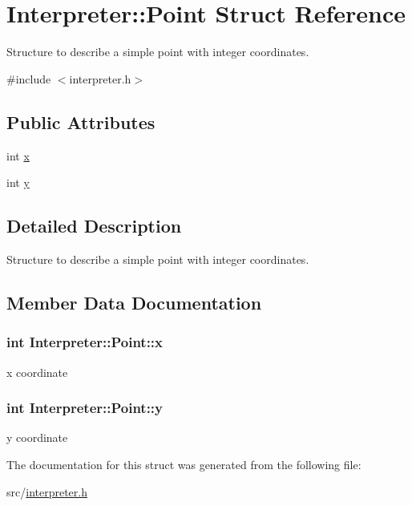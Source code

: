 \hypertarget{structInterpreter_1_1Point}{
\section{Interpreter::Point Struct Reference}
\label{structInterpreter_1_1Point}
}


Structure to describe a simple point with integer coordinates.  




{\ttfamily \#include $<$interpreter.h$>$}

\subsection*{Public Attributes}
\begin{DoxyCompactItemize}
\item 
int \hyperlink{structInterpreter_1_1Point_adb600c47a8131eae82454d92e81e6956}{x}
\item 
int \hyperlink{structInterpreter_1_1Point_a61e3664bd27fa93316e4cb7ec5758c54}{y}
\end{DoxyCompactItemize}


\subsection{Detailed Description}
Structure to describe a simple point with integer coordinates. 

\subsection{Member Data Documentation}
\hypertarget{structInterpreter_1_1Point_adb600c47a8131eae82454d92e81e6956}{
\subsubsection[{x}]{\setlength{\rightskip}{0pt plus 5cm}int {\bf Interpreter::Point::x}}}
\label{structInterpreter_1_1Point_adb600c47a8131eae82454d92e81e6956}
x coordinate \hypertarget{structInterpreter_1_1Point_a61e3664bd27fa93316e4cb7ec5758c54}{
\subsubsection[{y}]{\setlength{\rightskip}{0pt plus 5cm}int {\bf Interpreter::Point::y}}}
\label{structInterpreter_1_1Point_a61e3664bd27fa93316e4cb7ec5758c54}
y coordinate 

The documentation for this struct was generated from the following file:\begin{DoxyCompactItemize}
\item 
src/\hyperlink{interpreter_8h}{interpreter.h}\end{DoxyCompactItemize}
